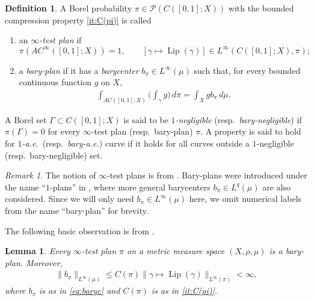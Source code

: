 \documentclass[11pt]{amsart}
\newtheorem{lemma}[theorem]{Lemma}
\theoremstyle{definition}
\newtheorem{definition}[theorem]{Definition}
\theoremstyle{remark}
\newtheorem{remark}[theorem]{Remark}
\numberwithin{equation}{section}
\begin{document}
\begin{definition}\label{def:plan}
A Borel probability $\pi\in\mathscr P(C([0,1];X))$ with the bounded compression property
\eqref{it:C(pi)} is called
\begin{enumerate}[\rm(i)]
  \item\label{it:infty-plan} an \emph{$\infty$-test plan} if
  \begin{equation*}
    \pi(AC^\infty([0,1];X))=1,\qquad
    [\gamma\mapsto{\operatorname{Lip}}(\gamma)]\in L^\infty(C([0,1];X),\pi);
  \end{equation*}
  \item\label{it:bary-plan} a \emph{bary-plan} if it has a \emph{barycenter} $b_\pi\in
  L^\infty(\mu)$
such that, for every bounded continuous function $g$ on $X$,
\begin{align}\label{eq:baryc}
\int_{AC([0,1];X)}\Bigg(\int_{\gamma}g \Bigg)\,d\pi =
\int_X gb_\pi\,d\mu.
\end{align}
\end{enumerate}
A Borel set $\Gamma\subset C([0,1];X)$ is said to be {\em $1$-negligible} (resp.\
\emph{bary-negligible}) if $\pi(\Gamma)=0$ for every $\infty$-test plan (resp.\ bary-plan)
$\pi$. A property is said to hold for {\em $1$-a.e.}\ (resp.\ \emph{bary-a.e.}) curve if it
holds for all curves outside a $1$-negligible (resp.\ bary-negligible) set.
\end{definition}

\begin{remark}
The notion of $\infty$-test plans is from \cite[Definition 5.5]{AD:14}.
Bary-plans were introduced under the name ``$1$-plans'' in \cite[Definition 2.2]{DMS}, where
more general barycenters $b_\pi\in L^q(\mu)$ are also considered. Since we will only need
$b_\pi\in L^\infty(\mu)$ here, we omit numerical labels from the name ``bary-plan'' for
brevity.
\end{remark}

The following basic observation is from \cite[Lemma 3.15]{AILP}.

\begin{lemma}\label{lem-plans}
Every $\infty$-test plan $\pi$ on a metric measure space $(X,\rho,\mu)$ is a bary-plan.
Moreover,
\begin{align}\label{bpi}
\|b_\pi\|_{L^\infty(\mu)}\le C(\pi)\|\gamma\mapsto{\operatorname{Lip}}(\gamma)
\|_{L^\infty(\pi)}<\infty,
\end{align}
where $b_\pi$ is as in \eqref{eq:baryc} and $C(\pi)$ is as in \eqref{it:C(pi)}.
\end{lemma}
\end{document}
